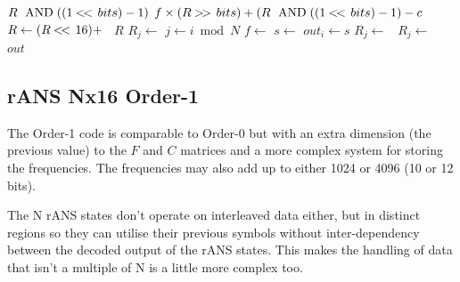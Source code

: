 \documentclass[a4paper]{article}
\begin{document}
\begin{algorithmic}[1]
  \State \Return $R\ \bitand ((1 \shiftl bits) -1)$
\EndFunction
{}
  \State \Return $f \times (R \shiftr bits) + (R\ \bitand ((1 \shiftl bits) -1) - c$
\EndFunction
\Statex
{}
    \State $R \gets (R \mathbin{<\mkern-3mu<\,} 16) +$\ 
  \EndIf
  \State \Return $R$
\EndFunction
\Statex
{}
  \State {}
    \State $R_j \gets$ 
  \EndFor
    \State $j \gets i \bmod N$
    \State $f \gets$ 
    \State $s \gets$ 
    \State $out_i \gets s$
    \State $R_j \gets$\ 
    \State $R_j \gets$\ 
  \EndFor
  \State \Return $out$
\EndFunction
\end{algorithmic}

\subsection{rANS Nx16 Order-1}

The Order-1 code is comparable to Order-0 but with an extra dimension
(the previous value) to the $F$ and $C$ matrices and a more complex
system for storing the frequencies.  The frequencies may also add up
to either 1024 or 4096 (10 or 12 bits).

The N rANS states don't operate on interleaved data either, but in
distinct regions so they can utilise their previous symbols without
inter-dependency between the decoded output of the rANS states.
This makes the handling of data that isn't a multiple of N is a little
more complex too.
\end{document}
